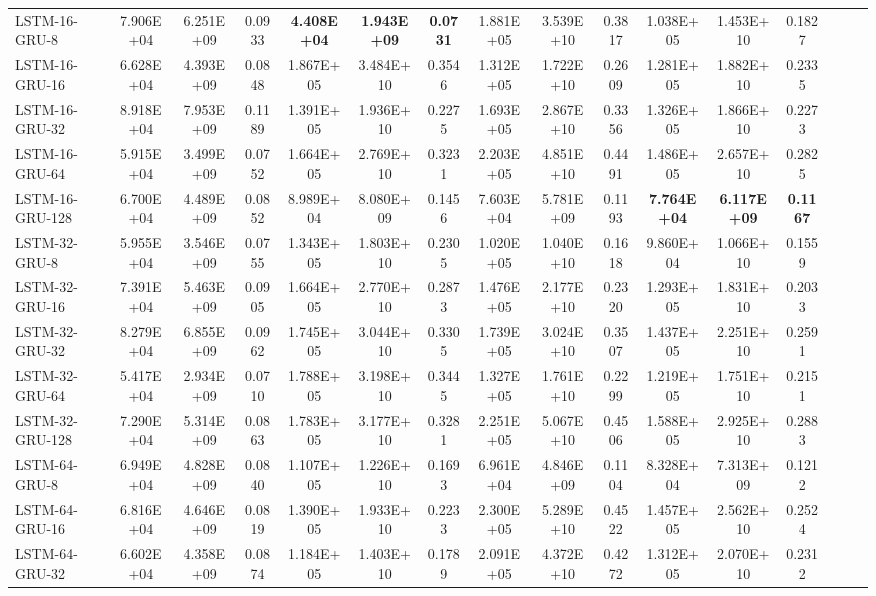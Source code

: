 \begin{landscape}
\begin{longtable}{|l|c|c|c|c|c|c|c|c|c|c|c|c|c|c|c|}
    LSTM-16-GRU-8 & 7.906E+04 & 6.251E+09 & 0.0933 & \cellcolor[rgb]{ .573,  .816,  .314}\textbf{4.408E+04} & \cellcolor[rgb]{ .573,  .816,  .314}\textbf{1.943E+09} & \cellcolor[rgb]{ .573,  .816,  .314}\textbf{0.0731} & 1.881E+05 & 3.539E+10 & 0.3817 & 1.038E+05 & 1.453E+10 & 0.1827 \\
    LSTM-16-GRU-16 & 6.628E+04 & 4.393E+09 & 0.0848 & 1.867E+05 & 3.484E+10 & 0.3546 & 1.312E+05 & 1.722E+10 & 0.2609 & 1.281E+05 & 1.882E+10 & 0.2335 \\
    LSTM-16-GRU-32 & 8.918E+04 & 7.953E+09 & 0.1189 & 1.391E+05 & 1.936E+10 & 0.2275 & 1.693E+05 & 2.867E+10 & 0.3356 & 1.326E+05 & 1.866E+10 & 0.2273 \\
    LSTM-16-GRU-64 & 5.915E+04 & 3.499E+09 & 0.0752 & 1.664E+05 & 2.769E+10 & 0.3231 & 2.203E+05 & 4.851E+10 & 0.4491 & 1.486E+05 & 2.657E+10 & 0.2825 \\
    LSTM-16-GRU-128 & 6.700E+04 & 4.489E+09 & 0.0852 & 8.989E+04 & 8.080E+09 & 0.1456 & 7.603E+04 & 5.781E+09 & 0.1193 & \cellcolor[rgb]{ .573,  .816,  .314}\textbf{7.764E+04} & \cellcolor[rgb]{ .573,  .816,  .314}\textbf{6.117E+09} & \cellcolor[rgb]{ .573,  .816,  .314}\textbf{0.1167} \\
    LSTM-32-GRU-8 & 5.955E+04 & 3.546E+09 & 0.0755 & 1.343E+05 & 1.803E+10 & 0.2305 & 1.020E+05 & 1.040E+10 & 0.1618 & 9.860E+04 & 1.066E+10 & 0.1559 \\
    LSTM-32-GRU-16 & 7.391E+04 & 5.463E+09 & 0.0905 & 1.664E+05 & 2.770E+10 & 0.2873 & 1.476E+05 & 2.177E+10 & 0.2320 & 1.293E+05 & 1.831E+10 & 0.2033 \\
    LSTM-32-GRU-32 & 8.279E+04 & 6.855E+09 & 0.0962 & 1.745E+05 & 3.044E+10 & 0.3305 & 1.739E+05 & 3.024E+10 & 0.3507 & 1.437E+05 & 2.251E+10 & 0.2591 \\
    LSTM-32-GRU-64 & 5.417E+04 & 2.934E+09 & 0.0710 & 1.788E+05 & 3.198E+10 & 0.3445 & 1.327E+05 & 1.761E+10 & 0.2299 & 1.219E+05 & 1.751E+10 & 0.2151 \\
    LSTM-32-GRU-128 & 7.290E+04 & 5.314E+09 & 0.0863 & 1.783E+05 & 3.177E+10 & 0.3281 & 2.251E+05 & 5.067E+10 & 0.4506 & 1.588E+05 & 2.925E+10 & 0.2883 \\
    LSTM-64-GRU-8 & 6.949E+04 & 4.828E+09 & 0.0840 & 1.107E+05 & 1.226E+10 & 0.1693 & 6.961E+04 & 4.846E+09 & 0.1104 & 8.328E+04 & 7.313E+09 & 0.1212 \\
    LSTM-64-GRU-16 & 6.816E+04 & 4.646E+09 & 0.0819 & 1.390E+05 & 1.933E+10 & 0.2233 & 2.300E+05 & 5.289E+10 & 0.4522 & 1.457E+05 & 2.562E+10 & 0.2524 \\
    LSTM-64-GRU-32 & 6.602E+04 & 4.358E+09 & 0.0874 & 1.184E+05 & 1.403E+10 & 0.1789 & 2.091E+05 & 4.372E+10 & 0.4272 & 1.312E+05 & 2.070E+10 & 0.2312 \\

\end{longtable}
\end{landscape}
